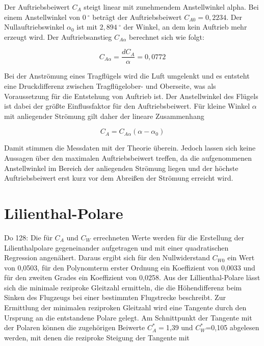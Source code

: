 Der Auftriebsbeiwert $C_A$ steigt linear mit zunehmendem Anstellwinkel alpha. Bei einem Anstellwinkel von $0 \ ^{\circ}$ beträgt der Auftriebsbeiwert $C_{A0}=0,2234$. Der Nullauftriebswinkel $\alpha_{0}$ ist mit $2,894 \ ^{\circ}$ der Winkel, an dem kein Auftrieb mehr erzeugt wird. Der Auftriebsanstieg $C_{A\alpha}$ berechnet sich wie folgt:

\begin{equation}
C_{A\alpha}=\frac{dC_A}{\alpha}=0,0772
\end{equation}

	
Bei der Anströmung eines Tragflügels wird die Luft umgelenkt und es entsteht eine Druckdifferenz zwischen Tragflügelober- und Oberseite, was als Voraussetzung für die Entstehung von Auftrieb ist. Der Anstellwinkel des Flügels ist dabei der größte Einflussfaktor für den Auftriebsbeiwert. Für kleine Winkel $\alpha$ mit anliegender Strömung gilt daher der lineare Zusammenhang

\begin {equation}
C_A=C_{A\alpha} \left(\alpha - \alpha_0\right)
\end{equation}

Damit stimmen die Messdaten mit der Theorie überein. Jedoch lassen sich keine Aussagen über den maximalen Auftriebsbeiwert treffen, da die aufgenommenen Anstellwinkel im Bereich der anliegenden Strömung liegen und der höchste Auftriebsbeiwert erst kurz vor dem Abreißen der Strömung erreicht wird. 

\section{Lilienthal-Polare}

Do 128:
Die für $C_A$ und $C_W$ errechneten Werte werden für die Erstellung der Lilienthalpolare gegeneinander aufgetragen und mit einer quadratischen Regression angenähert. Daraus ergibt sich für den Nullwiderstand $C_{W0}$ ein Wert von 0,0503, für den Polynomterm erster Ordnung ein Koeffizient von 0,0033 und für den zweiten Grades ein Koeffizient von 0,0258. 
Aus der Lillienthal-Polare lässt sich die minimale reziproke Gleitzahl ermitteln, die die Höhendifferenz beim Sinken des Flugzeugs bei einer bestimmten Flugstrecke beschreibt. Zur Ermittlung der minimalen reziproken Gleitzahl wird eine Tangente durch den Ursprung an die entstandene Polare gelegt. Am Schnittpunkt der Tangente mit der Polaren können die zugehörigen Beiwerte $C_A^*=$1,39 und  $C_W^*$=0,105 abgelesen werden, mit denen die reziproke Steigung der Tangente mit

